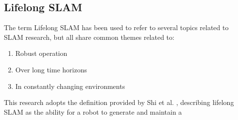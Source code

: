 \subsection{Lifelong SLAM}

The term Lifelong SLAM has been used to refer to several topics related to SLAM research, but all share common themes related to:
\begin{singlespace}
    \begin{enumerate}
        \item Robust operation
        \item Over long time horizons
        \item In constantly changing environments
    \end{enumerate}
\end{singlespace}
This research adopts the definition provided by Shi et al. \cite{shiAreWeReady2020}, describing lifelong SLAM as the ability for a robot to generate and maintain a 